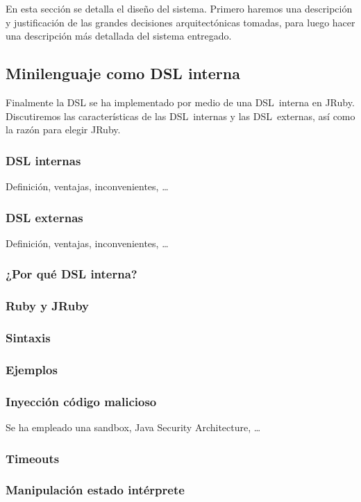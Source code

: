 En esta sección se detalla el diseño del sistema. Primero haremos una
descripción y justificación de las grandes decisiones arquitectónicas
tomadas, para luego hacer una descripción más detallada del sistema
entregado.

\subsection{Minilenguaje como DSL interna}
Finalmente la DSL se ha implementado por medio de una DSL~interna en
JRuby. Discutiremos las características de las DSL~internas y las
DSL~externas, así como la razón para elegir JRuby.
\subsubsection{DSL internas}
Definición, ventajas, inconvenientes, \ldots{}
\subsubsection{DSL externas}
Definición, ventajas, inconvenientes, \ldots{}
\subsubsection{¿Por qué DSL interna?}
\subsubsection{Ruby y JRuby}
\subsubsection{Sintaxis}
\subsubsection{Ejemplos}

\subsubsection{Inyección código malicioso}
Se ha empleado una sandbox, Java Security Architecture, \ldots{}
\subsubsection{Timeouts}
\subsubsection{Manipulación estado intérprete}
\label{interpreter_state_manipulation}

